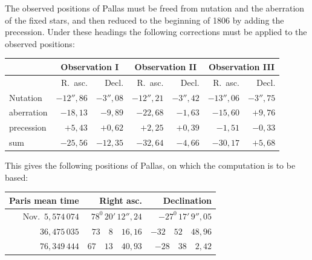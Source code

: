 The observed positions of Pallas must be freed from nutation and the aberration of the fixed stars, and then reduced to the beginning of 1806 by adding the precession. Under these headings the following corrections must be applied to the observed positions:
\begin{center}
\begingroup\footnotesize\setlength{\tabcolsep}{4pt}\renewcommand{\arraystretch}{1.2}
\begin{tabular}{|l|r|r||r|r||r|r|}\hline
& \multicolumn{2}{c||}{Observation I} & \multicolumn{2}{c||}{Observation II} & \multicolumn{2}{c|}{Observation III}\\\hline
& R.\ asc. & Decl. & R.\ asc. & Decl. & R.\ asc. & Decl.\\\hline
Nutation & $-12''{,}86$ & $-3''{,}08$ & $-12''{,}21$ & $-3''{,}42$ & $-13''{,}06$ & $-3''{,}75$\\
aberration & $-18{,}13$ & $-9{,}89$ & $-22{,}68$ & $-1{,}63$ & $-15{,}60$ & $+9{,}76$\\
precession & $+5{,}43$ & $+0{,}62$ & $+2{,}25$ & $+0{,}39$ & $-1{,}51$ & $-0{,}33$\\\hline
sum & $-25{,}56$ & $-12{,}35$ & $-32{,}64$ & $-4{,}66$ & $-30{,}17$ & $+5{,}68$\\\hline
\end{tabular}\endgroup
\end{center}

This gives the following positions of Pallas, on which the computation is to be based:
\begin{center}
\begingroup\small\setlength{\tabcolsep}{6pt}\renewcommand{\arraystretch}{1.2}
\begin{tabular}{|r|r|r|}\hline
Paris mean time & Right asc. & Declination\\\hline
Nov.\ $5{,}574\,074$ & $78^{0}\,20'\,12''{,}24$ & $-27^{0}\,17'\,9''{,}05$\\
$36{,}475\,035$ & $73\quad8\quad16{,}16$ & $-32\quad52\quad48{,}96$\\
$76{,}349\,444$ & $67\quad13\quad40{,}93$ & $-28\quad38\quad2{,}42$\\\hline
\end{tabular}\endgroup
\end{center}
